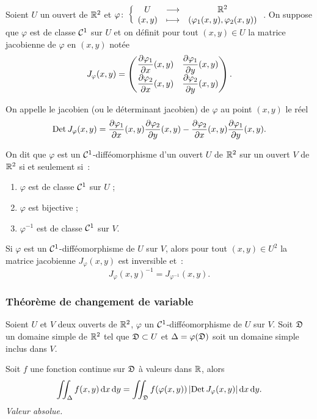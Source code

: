 \begin{defdef}
  Soient \(U\) un ouvert de \(\mathbb{R}^2\) et \(\varphi\colon \left\{\begin{array}{ccc} U & \longrightarrow &\mathbb{R}^2\\ (x,y) & \longmapsto & (\varphi_1(x,y),\varphi_2(x,y)) \end{array} \right.\). On suppose que \(\varphi\) est de classe \(\mathcal{C}^{1}\) sur \(U\) et on définit pour tout \((x,y) \in U\) la matrice jacobienne de \(\varphi\) en \((x,y)\) notée
  \begin{equation}
    J_\varphi(x,y) = \begin{pmatrix} \dfrac{\partial{} \varphi_1}{\partial{} x}(x,y) & \dfrac{\partial{} \varphi_1}{\partial{} y}(x,y) \\ \dfrac{\partial{} \varphi_2}{\partial{} x}(x,y) & \dfrac{\partial{} \varphi_2}{\partial{} y}(x,y) \end{pmatrix}.
  \end{equation}

  On appelle le jacobien (ou le déterminant jacobien) de \(\varphi\) au point \((x,y)\) le réel
  \begin{equation}
    \operatorname{Det} J_\varphi(x,y) = \dfrac{\partial{} \varphi_1}{\partial{} x}(x,y) \dfrac{\partial{} \varphi_2}{\partial{} y}(x,y) - \dfrac{\partial{} \varphi_2}{\partial{} x}(x,y) \dfrac{\partial{} \varphi_1}{\partial{} y}(x,y).
  \end{equation}
\end{defdef}
%
\begin{defdef}
  On dit que \(\varphi\) est un \(\mathcal{C}^{1}\)-difféomorphisme d'un ouvert \(U\) de \(\mathbb{R}^2\) sur un ouvert \(V\) de \(\mathbb{R}^2\) si et seulement si~:
  \begin{enumerate}
  \item \(\varphi\) est de classe \(\mathcal{C}^{1}\) sur \(U\) ;
  \item \(\varphi\) est bijective ;
  \item \(\varphi^{-1}\) est de classe \(\mathcal{C}^{1}\) sur \(V\).
  \end{enumerate}
\end{defdef}
%
\begin{prop}[Admise]
  Si \(\varphi\) est un \(\mathcal{C}^{1}\)-difféomorphisme de \(U\) sur \(V\), alors pour tout \((x,y) \in U^2\) la matrice jacobienne \(J_\varphi(x,y)\) est inversible et~:
  \begin{equation}
    J_\varphi(x,y)^{-1} = J_{\varphi^{-1}}(x,y).
  \end{equation}
\end{prop}

\subsubsection{Théorème de changement de variable}

\begin{theo}
  Soient \(U\) et \(V\) deux ouverts de \(\mathbb{R}^2\), \(\varphi\) un \(\mathcal{C}^{1}\)-difféomorphisme de \(U\) sur \(V\). Soit \(\mathfrak{D}\) un domaine simple de \(\mathbb{R}^2\) tel que \(\mathfrak{D} \subset U\) et \(\Delta = \varphi(\mathfrak{D})\) soit un domaine simple inclus dans \(V\).

  Soit \(f\) une fonction continue sur \(\mathfrak{D}\) à valeurs dans \(\mathbb{R}\), alors
  \begin{equation}
    \iint_\Delta f(x,y)\mathop{}\mathopen{}\mathrm{d} x \mathop{}\mathopen{}\mathrm{d} y = \iint_{\mathfrak{D}} f(\varphi(x,y)) \left\lvert\operatorname{Det} J_\varphi(x,y)\right\rvert\mathop{}\mathopen{}\mathrm{d} x \mathop{}\mathopen{}\mathrm{d} y.
  \end{equation}
  \emph{Valeur absolue.}
\end{theo}

